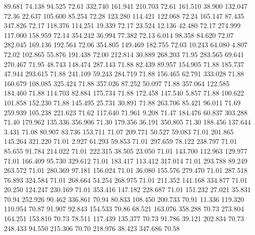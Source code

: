   89.681   74.138   94.525        72.61
 332.740  161.941  210.703        72.61
 161.510   38.900  132.047        72.36
  22.637  105.600   85.254        72.28
 123.280  114.421  122.068        72.24
 165.147   87.435  347.826        72.17
 118.376  114.251   19.339        72.17
  23.524   12.136   42.480        72.17
 274.999  117.000  158.959        72.14
 354.242   36.994   77.382        72.13
   6.014   98.358   84.620        72.07
 282.045  169.136  192.564        72.06
 354.805  149.469  182.755        72.03
  10.243   64.080    4.807        72.02
 102.865   55.876  191.438        72.00
 212.814   30.889  268.203        71.95
 283.565   69.641  270.467        71.95
  48.743  148.474  287.143        71.88
  82.439   89.957  154.905        71.88
 185.737   47.944  293.615        71.88
 241.109   59.243  284.719        71.88
 156.465   62.791  333.028        71.88
 160.679  108.085  325.424        71.88
 357.026   87.252   50.097        71.88
 357.064  122.585  184.460        71.88
 114.703   82.884  175.734        71.88
 172.458  147.540    5.857        71.88
 100.622  101.858  152.230        71.88
 145.495   25.731   30.891        71.88
 263.706   85.421   96.011        71.69
 259.939  105.238  221.623        71.62
 117.640   71.961    9.208        71.47
 184.476   60.837  303.288        71.40
 179.962  135.336  356.906        71.30
 179.356   36.191  350.805        71.30
 188.456  137.644    3.431        71.08
  80.907   83.736  153.711        71.07
 209.771   50.527   59.083        71.01
 201.865  145.264  321.220        71.01
   2.927   61.293   59.853        71.01
 297.659   78.122  238.797        71.01
  85.655   91.784  214.022        71.01
 222.315   38.505   23.050        71.01
 143.700  112.963  129.977        71.01
 166.409   95.730  329.612        71.01
 183.417  113.412  317.014        71.01
 293.788   89.249  263.572        71.01
 280.369   97.181  156.024        71.01
  36.080  155.576  279.470        71.01
 287.518   76.893  324.584        71.01
 268.664   54.254  268.975        71.01
 211.352  141.168  334.877        71.01
  20.250  124.247  230.169        71.01
 353.416  147.182  228.687        71.01
 151.232   27.021   35.831        70.94
 252.926   90.462  336.861        70.94
  80.833  108.450  200.733        70.91
  11.336  119.320  110.954        70.87
  91.907   92.843  154.533        70.86
  68.521  163.076  358.288        70.73
 273.804  164.251  153.810        70.73
  78.511  117.439  135.377        70.73
  91.786   39.121  202.834        70.73
 248.433   94.550  215.306        70.70
 218.976   38.423  347.686        70.58
